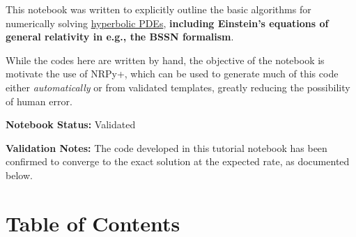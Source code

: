 \documentclass[landscape,letterpaper,10pt,english]{article}
\begin{document}
This notebook was written to explicitly outline the basic algorithms for
numerically solving
\href{https://en.wikipedia.org/wiki/Hyperbolic_partial_differential_equation}{hyperbolic
PDEs}, \textbf{including Einstein's equations of general relativity in
e.g., the BSSN formalism}.

While the codes here are written by hand, the objective of the notebook
is motivate the use of NRPy+, which can be used to generate much of this
code either \emph{automatically} or from validated templates, greatly
reducing the possibility of human error.

\textbf{Notebook Status:} Validated

\textbf{Validation Notes:} The code developed in this tutorial notebook
has been confirmed to converge to the exact solution at the expected
rate, as documented below.

    \hypertarget{table-of-contents}{%
\section{Table of Contents}\label{table-of-contents}}

\[\label{toc}\]
\end{document}
